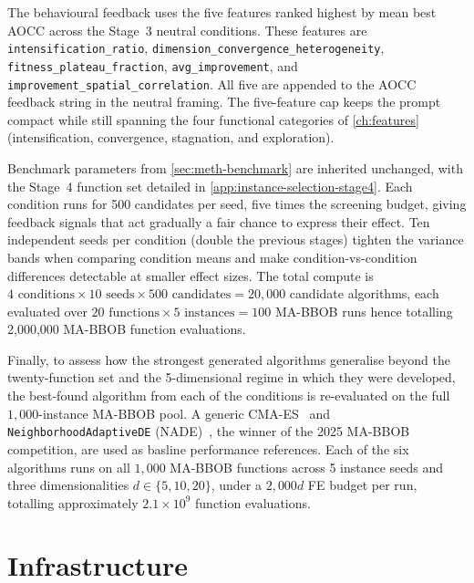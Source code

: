 The behavioural feedback uses the five features ranked highest by mean best AOCC across the Stage~3 neutral conditions. These features are \texttt{intensification\_ratio}, \texttt{dimension\_convergence\_heterogeneity}, \texttt{fitness\_plateau\_fraction}, \texttt{avg\_improvement}, and \texttt{improvement\_spatial\_correlation}. All five are appended to the AOCC feedback string in the neutral framing. The five-feature cap keeps the prompt compact while still spanning the four functional categories of \cref{ch:features} (intensification, convergence, stagnation, and exploration).

Benchmark parameters from \cref{sec:meth-benchmark} are inherited unchanged, with the Stage~4 function set detailed in \cref{app:instance-selection-stage4}. Each condition runs for 500 candidates per seed, five times the screening budget, giving feedback signals that act gradually a fair chance to express their effect. Ten independent seeds per condition (double the previous stages) tighten the variance bands when comparing condition means and make condition-vs-condition differences detectable at smaller effect sizes. The total compute is $4 \text{ conditions} \times 10 \text{ seeds} \times 500 \text{ candidates} = 20{,}000$ candidate algorithms, each evaluated over $20 \text{ functions} \times 5 \text{ instances} = 100$ MA-BBOB runs hence totalling 2,000,000 MA-BBOB function evaluations.

Finally, to assess how the strongest generated algorithms generalise beyond the twenty-function set and the 5-dimensional regime in which they were developed, the best-found algorithm from each of the conditions is re-evaluated on the full $1{,}000$-instance MA-BBOB pool. A generic CMA-ES~\cite{hansen2001cmaes} and \texttt{NeighborhoodAdaptiveDE} (NADE)~\cite{vanStein2025NeighborhoodDE}, the winner of the 2025 MA-BBOB competition, are used as basline performance references. Each of the six algorithms runs on all $1{,}000$ MA-BBOB functions across 5 instance seeds and three dimensionalities $d \in \{5, 10, 20\}$, under a $2{,}000d$ FE budget per run, totalling approximately $2.1 \times 10^9$ function evaluations.

\section{Infrastructure}
\label{sec:meth-infrastructure}

